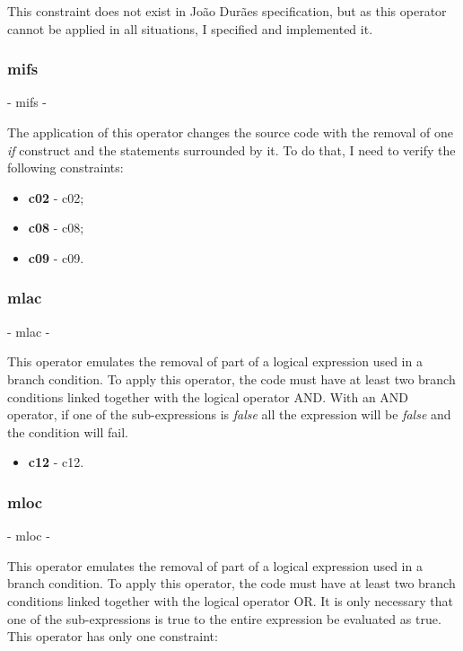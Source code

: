 	This constraint does not exist in João Durães specification, but as this operator cannot be applied in all situations, I specified and implemented it.

	\subsubsection{\textbf{\acs{mifs}}} - \Acl{mifs} - 

	The application of this operator changes the source code with the removal of one \textit{if} construct and the statements surrounded by it.
	To do that, I need to verify the following constraints:
	\begin{itemize}
		\item \textbf{\acs{c02}} - \Acl{c02};
		\item \textbf{\acs{c08}} - \Acl{c08};
		\item \textbf{\acs{c09}} - \Acl{c09}.
	\end{itemize}

	\subsubsection{\textbf{\acs{mlac}}} - \Acl{mlac} - 

	This operator emulates the removal of part of a logical expression used in a branch condition. To apply this operator, the code must have at least two branch conditions linked together with the logical operator AND. With an AND operator, if one of the sub-expressions is \textit{false} all the expression will be \textit{false} and the condition will fail.
	\begin{itemize}
		\item \textbf{\acs{c12}} - \Acl{c12}.
	\end{itemize}

	\subsubsection{\textbf{\acs{mloc}}} - \Acl{mloc} - 

	This operator emulates the removal of part of a logical expression used in a branch condition. To apply this operator, the code must have at least two branch conditions linked together with the logical operator OR. It is only necessary that one of the sub-expressions is true to the entire expression be evaluated as true. This operator has only one constraint:

